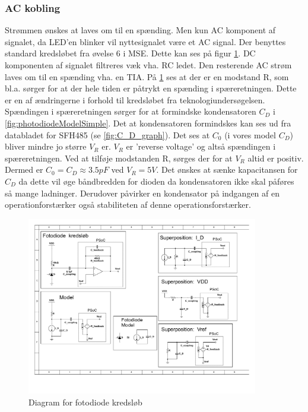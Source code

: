 \documentclass[HardwareDesign/HardwareDesign_main.tex]{subfiles}
\begin{document}
\subsubsection{AC kobling}
Strømmen ønskes at laves om til en spænding. Men kun AC komponent af signalet, da LED'en blinker vil nyttesignalet være et AC signal. Der benyttes standard kredsløbet fra øvelse 6 i MSE. Dette kan ses på figur \ref{fig:photodiodeCircuit}. DC komponenten af signalet filtreres væk vha. RC ledet. Den resterende AC strøm laves om til en spænding vha. en TIA. På \ref{fig:photodiodeCircuit} ses at der er en modstand R, som bl.a. sørger for at der hele tiden er påtrykt en spænding i spæreretningen. Dette er en af ændringerne i forhold til kredsløbet fra teknologiundersøgelsen. Spændingen i spæreretningen sørger for at formindske kondensatoren $C_D$ i \ref{fig:photodiodeModelSimple}. Det at kondensatoren formindskes kan ses ud fra databladet for SFH485 (se \ref{fig:C_D_graph}). Det ses at $C_0$ (i vores model $C_D$) bliver mindre jo større $V_R$ er. $V_R$ er 'reverse voltage' og altså spændingen i spæreretningen. Ved at tilføje modstanden R, sørges der for at $V_R$ altid er positiv. Dermed er $C_0 = C_D \approx 3.5\si{pF}$ ved $V_R=5\si{V}$. Det ønskes at sænke kapacitansen for $C_D$ da dette vil øge båndbredden for dioden da kondensatoren ikke skal påføres så mange ladninger. Derudover påvirker en kondensator på indgangen af en operationforstærker også stabiliteten af denne operationsforstærker.

\begin{figure}[H]
    \centering
    \includegraphics[width=0.9\textwidth,trim={0.6in 5.1in 6.0in 0.55in},clip, page=1]{HardwareDesign/CupSensor/graphics/Superposition.pdf}
    \caption{Diagram for fotodiode kredsløb}
    \label{fig:photodiodeCircuit}
\end{figure}
\end{document}
